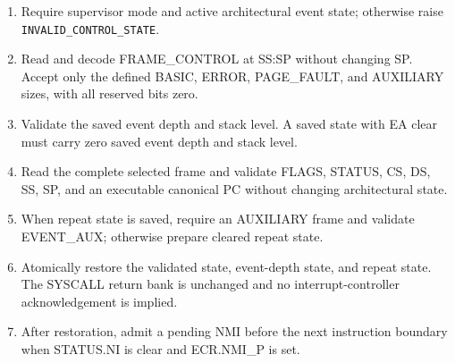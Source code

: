 \begin{enumerate}
\item Require supervisor mode and active architectural event state; otherwise raise \texttt{INVALID\_CONTROL\_STATE}.
\item Read and decode FRAME\_CONTROL at SS:SP without changing SP. Accept only the defined BASIC, ERROR, PAGE\_FAULT, and AUXILIARY sizes, with all reserved bits zero.
\item Validate the saved event depth and stack level. A saved state with EA clear must carry zero saved event depth and stack level.
\item Read the complete selected frame and validate FLAGS, STATUS, CS, DS, SS, SP, and an executable canonical PC without changing architectural state.
\item When repeat state is saved, require an AUXILIARY frame and validate EVENT\_AUX; otherwise prepare cleared repeat state.
\item Atomically restore the validated state, event-depth state, and repeat state. The SYSCALL return bank is unchanged and no interrupt-controller acknowledgement is implied.
\item After restoration, admit a pending NMI before the next instruction boundary when STATUS.NI is clear and ECR.NMI\_P is set.
\end{enumerate}
